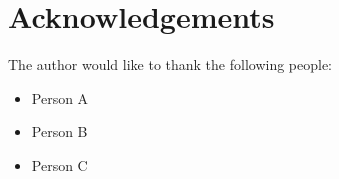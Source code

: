 \chapter{Acknowledgements}

The author would like to thank the following people:

\begin{itemize}
    \item Person A
    \item Person B
    \item Person C
\end{itemize}